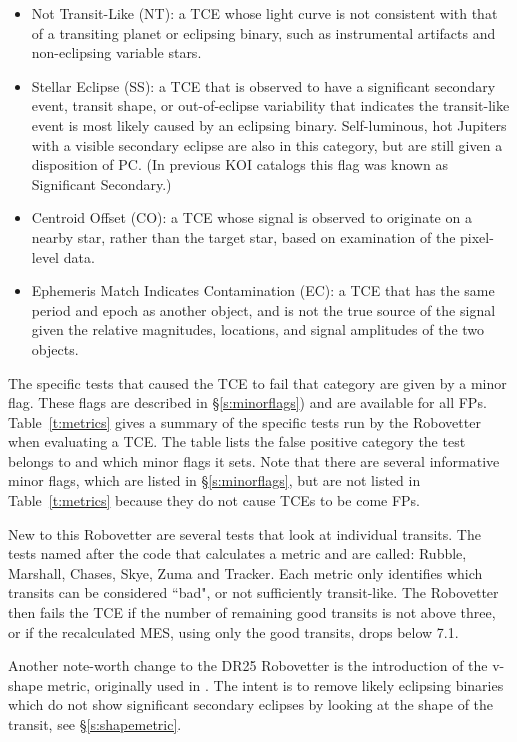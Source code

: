 \begin{itemize}
  \item Not Transit-Like (NT): a TCE whose light curve is not consistent with that of a transiting planet or eclipsing binary, such as instrumental artifacts and non-eclipsing variable stars.
  \item  Stellar Eclipse (SS): a TCE that is observed to have a significant secondary event, transit shape, or out-of-eclipse variability that indicates the transit-like event is most likely caused by an eclipsing binary. Self-luminous, hot Jupiters with a visible secondary eclipse are also in this category, but are still given a disposition of PC. (In previous KOI catalogs this flag was known as Significant Secondary.)
  \item Centroid Offset (CO): a TCE whose signal is observed to originate on a nearby star, rather than the target star, based on examination of the pixel-level data.
  \item Ephemeris Match Indicates Contamination (EC): a TCE that has the same period and epoch as another object, and is not the true source of the signal given the relative magnitudes, locations, and signal amplitudes of the two objects.
\end{itemize}

The specific tests that caused the TCE to fail that category are given by a minor flag. These flags are described in \S\ref{s:minorflags}) and are available for all FPs.  Table~\ref{t:metrics} gives a summary of the specific tests run by the Robovetter when evaluating a TCE.  The table lists the false positive category the test belongs to and which minor flags it sets.  Note that there are several informative minor flags, which are listed in \S\ref{s:minorflags}, but are not listed in Table~\ref{t:metrics} because they do not cause TCEs to be come FPs.

New to this Robovetter are several tests that look at individual transits. The tests named after the code that calculates a metric and are called: Rubble, Marshall, Chases, Skye, Zuma and Tracker.  Each metric only identifies which transits can be considered ``bad", or not sufficiently transit-like.  The Robovetter then fails the TCE if the number of remaining good transits is not above three, or if the recalculated MES, using only the good transits, drops below 7.1.

Another note-worth change to the DR25 Robovetter is the introduction of the v-shape metric, originally used in \citet{Batalha2013}.  The intent is to remove likely eclipsing binaries which do not show significant secondary eclipses by looking at the shape of the transit, see \S\ref{s:shapemetric}.

